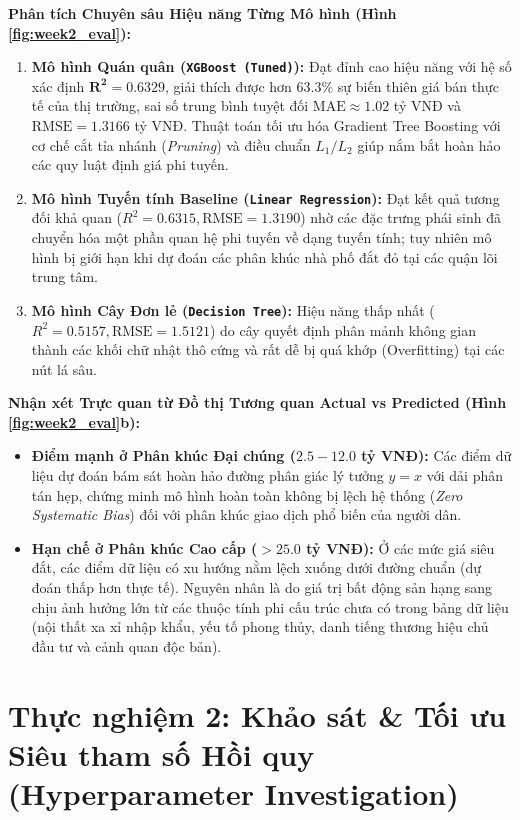 \documentclass[12pt,a4paper]{report}
\begin{document}
\textbf{Phân tích Chuyên sâu Hiệu năng Từng Mô hình (Hình \ref{fig:week2_eval}):}
\begin{enumerate}[leftmargin=1.5em]
    \item \textbf{Mô hình Quán quân (\texttt{XGBoost (Tuned)}):} Đạt đỉnh cao hiệu năng với hệ số xác định $\mathbf{R^2 = 0.6329}$, giải thích được hơn $63.3\%$ sự biến thiên giá bán thực tế của thị trường, sai số trung bình tuyệt đối $\text{MAE} \approx 1.02$ tỷ VNĐ và $\text{RMSE} = 1.3166$ tỷ VNĐ. Thuật toán tối ưu hóa Gradient Tree Boosting với cơ chế cắt tỉa nhánh (\textit{Pruning}) và điều chuẩn $L_1/L_2$ giúp nắm bắt hoàn hảo các quy luật định giá phi tuyến.
    \item \textbf{Mô hình Tuyến tính Baseline (\texttt{Linear Regression}):} Đạt kết quả tương đối khả quan ($R^2 = 0.6315, \text{RMSE} = 1.3190$) nhờ các đặc trưng phái sinh đã chuyển hóa một phần quan hệ phi tuyến về dạng tuyến tính; tuy nhiên mô hình bị giới hạn khi dự đoán các phân khúc nhà phố đắt đỏ tại các quận lõi trung tâm.
    \item \textbf{Mô hình Cây Đơn lẻ (\texttt{Decision Tree}):} Hiệu năng thấp nhất ($R^2 = 0.5157, \text{RMSE} = 1.5121$) do cây quyết định phân mảnh không gian thành các khối chữ nhật thô cứng và rất dễ bị quá khớp (Overfitting) tại các nút lá sâu.
\end{enumerate}

\textbf{Nhận xét Trực quan từ Đồ thị Tương quan Actual vs Predicted (Hình \ref{fig:week2_eval}b):}
\begin{itemize}[leftmargin=1.5em]
    \item \textbf{Điểm mạnh ở Phân khúc Đại chúng ($2.5 - 12.0$ tỷ VNĐ):} Các điểm dữ liệu dự đoán bám sát hoàn hảo đường phân giác lý tưởng $y = x$ với dải phân tán hẹp, chứng minh mô hình hoàn toàn không bị lệch hệ thống (\textit{Zero Systematic Bias}) đối với phân khúc giao dịch phổ biến của người dân.
    \item \textbf{Hạn chế ở Phân khúc Cao cấp ($> 25.0$ tỷ VNĐ):} Ở các mức giá siêu đắt, các điểm dữ liệu có xu hướng nằm lệch xuống dưới đường chuẩn (dự đoán thấp hơn thực tế). Nguyên nhân là do giá trị bất động sản hạng sang chịu ảnh hưởng lớn từ các thuộc tính phi cấu trúc chưa có trong bảng dữ liệu (nội thất xa xỉ nhập khẩu, yếu tố phong thủy, danh tiếng thương hiệu chủ đầu tư và cảnh quan độc bản).
\end{itemize}

\section{Thực nghiệm 2: Khảo sát \& Tối ưu Siêu tham số Hồi quy (Hyperparameter Investigation)}
\end{document}
